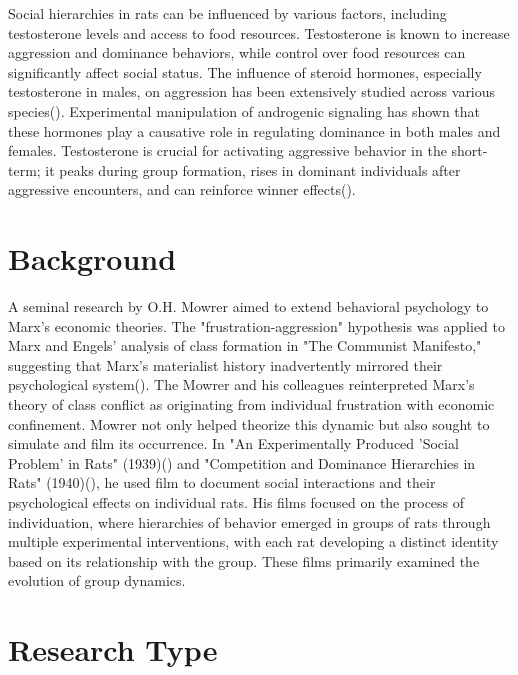 \documentclass[english, a4paper, 11pt]{article}
\begin{document}
Social hierarchies in rats can be influenced by various factors, including testosterone levels and access to food resources. Testosterone is known to increase aggression and dominance behaviors, while control over food resources can significantly affect social status. The influence of steroid hormones, especially testosterone in males, on aggression has been extensively studied across various species(\cite{hamiltonSocialNeuroendocrinologyStatus2015}). Experimental manipulation of androgenic signaling has shown that these hormones play a causative role in regulating dominance in both males and females. Testosterone is crucial for activating aggressive behavior in the short-term; it peaks during group formation, rises in dominant individuals after aggressive encounters, and can reinforce winner effects(\cite{fuxjagerSpeciesDifferencesWinner2011,oliveiraWhyWinnersKeep2009}).

\section*{Background}
A seminal research by O.H. Mowrer aimed to extend behavioral psychology to Marx’s economic theories. The "frustration-aggression" hypothesis was applied to Marx and Engels' analysis of class formation in "The Communist Manifesto," suggesting that Marx's materialist history inadvertently mirrored their psychological system(\cite{dollardFrustrationAggression1939}). The Mowrer and his colleagues  reinterpreted Marx’s theory of class conflict as originating from individual frustration with economic confinement. Mowrer not only helped theorize this dynamic but also sought to simulate and film its occurrence. In "An Experimentally Produced 'Social Problem' in Rats" (1939)(\cite{nationallibraryofmedicineExperimentallyProducedSocial2021}) and "Competition and Dominance Hierarchies in Rats" (1940)(\cite{paulofranciscoslompCompetitionDominanceHierarchies2011}), he used film to document social interactions and their psychological effects on individual rats. His films focused on the process of individuation, where hierarchies of behavior emerged in groups of rats through multiple experimental interventions, with each rat developing a distinct identity based on its relationship with the group. These films primarily examined the evolution of group dynamics.


\section*{Research Type}
\end{document}
